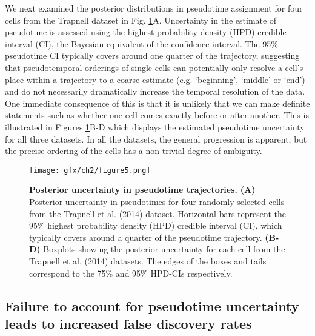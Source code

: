 We next examined the posterior distributions in pseudotime assignment for four cells from the Trapnell dataset in Fig. \ref{fig:posuncert}A. Uncertainty in the estimate of pseudotime is assessed using the highest probability density (HPD) credible interval (CI), the Bayesian equivalent of the confidence interval. The 95\% pseudotime CI typically covers around one quarter of the trajectory, suggesting that pseudotemporal orderings of single-cells can potentially only resolve a cell's place within a trajectory to a coarse estimate (e.g. `beginning', `middle' or `end') and do not necessarily dramatically increase the temporal resolution of the data. One immediate consequence of this is that it is unlikely that we can make definite statements such as whether one cell comes exactly before or after another. This is illustrated in Figures \ref{fig:posuncert}B-D which displays the estimated pseudotime uncertainty for all three datasets. In all the datasets, the general progression is apparent, but the precise ordering of the cells has a non-trivial degree of ambiguity.

\begin{figure}[h]
\centering
	\texttt{[image: gfx/ch2/figure5.png]}
    \caption{ {\bf  Posterior uncertainty in pseudotime trajectories. } \textbf{(A)} Posterior uncertainty in pseudotimes for four randomly selected cells from the Trapnell et al. (2014) dataset. Horizontal bars represent the 95\% highest probability density (HPD) credible interval (CI), which typically covers around a quarter of the pseudotime trajectory. \textbf{(B-D)} Boxplots showing the posterior uncertainty for each cell from the Trapnell et al. (2014) datasets. The edges of the boxes and tails correspond to the 75\% and 95\% HPD-CIs respectively.} \label{fig:posuncert}
\end{figure}


\subsection{Failure to account for pseudotime uncertainty leads to increased false discovery rates}

